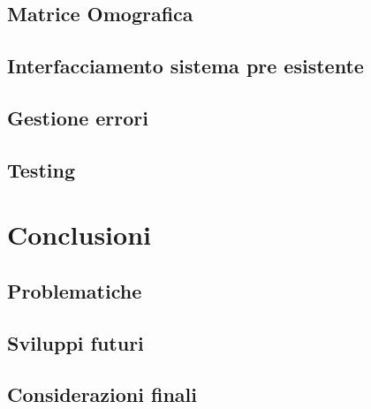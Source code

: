 \documentclass[twoside]{supsistudent}
\begin{document}
\section{Matrice Omografica}

\section{Interfacciamento sistema pre esistente}

\section{Gestione errori}

\section{Testing}

\chapter{Conclusioni}

\section{Problematiche}

\section{Sviluppi futuri}

\section{Considerazioni finali}






\end{document}
